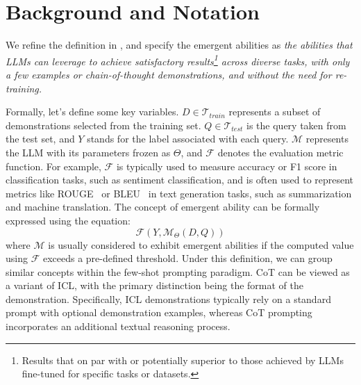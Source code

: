 \section{Background and Notation}
\label{sec:bg}
We refine the definition in \citet{Wei2022EmergentAO}, and specify the emergent abilities as \textit{the abilities that LLMs can leverage to achieve \textit{satisfactory results}\footnote{Results that on par with or potentially superior to those achieved by LLMs fine-tuned for specific tasks or datasets.} across diverse tasks, with only a few examples or chain-of-thought demonstrations, and without the need for re-training.}

Formally, let's define some key variables. $D \in \mathcal T_{train}$ represents a subset of demonstrations selected from the training set.
$Q\in \mathcal T_{test}$ is the query taken from the test set, and $Y$ stands for the label associated with each query. $\mathcal M$ represents the LLM with its parameters frozen as $\Theta$, and $\mathcal F$ denotes the evaluation metric function. 
For example, $\mathcal F$ is typically used to measure accuracy or F1 score in classification tasks, such as sentiment classification, and is often used to represent metrics like ROUGE~\cite{Lin2004ROUGEAP} or BLEU~\cite{Papineni2002BleuAM} in text generation tasks, such as summarization and machine translation.
The concept of emergent ability can be formally expressed using the equation:
\begin{equation}
	\mathcal F (Y,\mathcal M_\Theta(D,Q))
\end{equation}
where $\mathcal M$ is usually considered to exhibit emergent abilities if the computed value using $\mathcal F$ exceeds a pre-defined threshold. 
Under this definition, we can group similar concepts within the few-shot prompting paradigm. 
CoT can be viewed as a variant of ICL, with the primary distinction being the format of the demonstration. 
Specifically, ICL demonstrations typically rely on a standard prompt with optional demonstration examples, whereas  CoT prompting incorporates an additional textual reasoning process.

